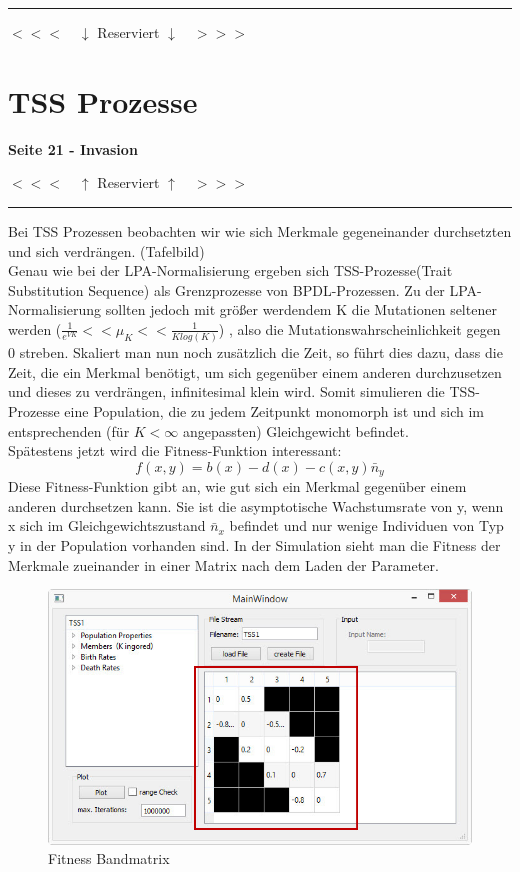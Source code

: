 \documentclass[11pt, a4paper, german]{article}
\theoremstyle{plain}
\begin{document}
	
\clearpage
\noindent\rule{\textwidth}{2pt}
\begin{center}
	$ <<< \quad \downarrow $ Reserviert $ \downarrow \quad >>> $
\end{center}


\section{TSS Prozesse}
\textbf{Seite 21 - Invasion}\\


\begin{center}
	$ <<< \quad \uparrow $ Reserviert $ \uparrow \quad >>> $
\end{center}
\noindent\rule{\textwidth}{2pt}

Bei TSS Prozessen beobachten wir wie sich Merkmale gegeneinander durchsetzten und sich verdrängen. (Tafelbild)\\
Genau wie bei der LPA-Normalisierung ergeben sich TSS-Prozesse(Trait Substitution Sequence) als Grenzprozesse von BPDL-Prozessen. Zu der LPA-Normalisierung sollten jedoch mit größer werdendem K die Mutationen seltener werden ($ \frac{1}{e^{VK}} << \mu_K << \frac{1}{K log(K)} $) , also die Mutationswahrscheinlichkeit gegen 0 streben. Skaliert man nun noch zusätzlich die Zeit, so führt dies dazu, dass die Zeit, die ein Merkmal benötigt, um sich gegenüber einem anderen durchzusetzen und dieses zu verdrängen, infinitesimal klein wird. Somit simulieren die TSS-Prozesse eine Population, die zu jedem Zeitpunkt monomorph ist und sich im entsprechenden (für $ K < \infty $ angepassten) Gleichgewicht befindet.\\
Spätestens jetzt wird die Fitness-Funktion interessant:
\[ f(x,y) = b(x) - d(x) - c(x,y)\bar{n}_y \]
Diese Fitness-Funktion gibt an, wie gut sich ein Merkmal gegenüber einem anderen durchsetzen kann. Sie ist die asymptotische Wachstumsrate von y, wenn x sich im Gleichgewichtszustand $ \bar{n}_x $ befindet und nur wenige Individuen von Typ y in der Population vorhanden sind. In der Simulation sieht man die Fitness der Merkmale zueinander in einer Matrix nach dem Laden der Parameter.
\begin{figure}[H]
	\centering
	\includegraphics[width=0.7\linewidth]{./Pictures/MainWindow_BandMatrix}
	\caption[Fitness Matrix]{Fitness Bandmatrix}
	\label{MainWindow mit Fitness Bandmatrix}
\end{figure}
\end{document}
